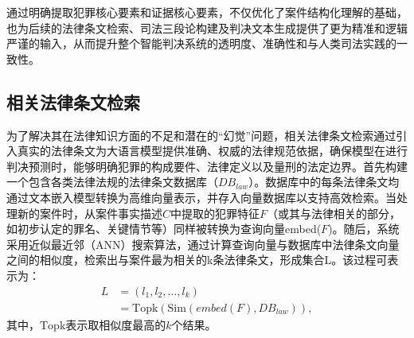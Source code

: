 通过明确提取犯罪核心要素和证据核心要素，不仅优化了案件结构化理解的基础，也为后续的法律条文检索、司法三段论构建及判决文本生成提供了更为精准和逻辑严谨的输入，从而提升整个智能判决系统的透明度、准确性和与人类司法实践的一致性。
\subsection{\heiti 相关法律条文检索}

为了解决其在法律知识方面的不足和潜在的“幻觉”问题，相关法律条文检索通过引入真实的法律条文为大语言模型提供准确、权威的法律规范依据，确保模型在进行判决预测时，能够明确犯罪的构成要件、法律定义以及量刑的法定边界。首先构建一个包含各类法律法规的法律条文数据库（$DB_{law}$​）。数据库中的每条法律条文均通过文本嵌入模型转换为高维向量表示，并存入向量数据库以支持高效检索。当处理新的案件时，从案件事实描述$C$中提取的犯罪特征$F$（或其与法律相关的部分，如初步认定的罪名、关键情节等）同样被转换为查询向量embed($F$)。随后，系统采用近似最近邻（ANN）搜索算法，通过计算查询向量与数据库中法律条文向量之间的相似度，检索出与案件最为相关的k条法律条文，形成集合L。该过程可表示为：
\begin{equation}
	\begin{aligned}
		L & =(l_1​,l_2​,\dots,l_k​)                       \\
		  & =\text{Topk}​(\text{Sim}(embed(F),DB_{law})),
	\end{aligned}
\end{equation}
其中，$\text{Topk}​$表示取相似度最高的$k$个结果。
